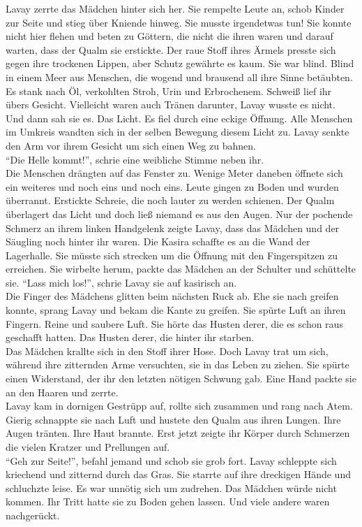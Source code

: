 Lavay zerrte das Mädchen hinter sich her. Sie rempelte Leute an, schob Kinder zur Seite und stieg 
über Kniende hinweg. Sie musste irgendetwas tun! Sie konnte nicht hier flehen und beten zu Göttern, 
die nicht die ihren waren und darauf warten, dass der Qualm sie erstickte. Der raue Stoff ihres 
Ärmels presste sich gegen ihre trockenen Lippen, aber Schutz gewährte es kaum. Sie war blind. Blind 
in einem Meer aus Menschen, die wogend und brausend all ihre Sinne betäubten. Es stank nach Öl, 
verkohlten Stroh, Urin und Erbrochenem. Schweiß lief ihr übers Gesicht. Vielleicht waren auch 
Tränen darunter, Lavay wusste es nicht.\\
Und dann sah sie es. Das Licht. Es fiel durch eine eckige Öffnung. Alle Menschen im Umkreis wandten 
sich in der selben Bewegung diesem Licht zu. Lavay senkte den Arm vor ihrem Gesicht um sich einen 
Weg zu bahnen.\\
``Die Helle kommt!'', schrie eine weibliche Stimme neben ihr.\\
Die Menschen drängten auf das Fenster zu. Wenige Meter daneben öffnete sich ein weiteres und noch 
eins und noch eins. Leute gingen zu Boden und wurden überrannt. Erstickte Schreie, die noch lauter 
zu werden schienen. Der Qualm überlagert das Licht und doch ließ niemand es aus den Augen. Nur der 
pochende Schmerz an ihrem linken Handgelenk zeigte Lavay, dass das Mädchen und der Säugling noch 
hinter ihr waren. Die Kasira schaffte es an die Wand der Lagerhalle. Sie müsste sich strecken um 
die Öffnung mit den Fingerspitzen zu erreichen. Sie wirbelte herum, packte das Mädchen an der  
Schulter und schüttelte sie. ``Lass mich los!'', schrie Lavay sie auf kasirisch an.\\
Die Finger des Mädchens glitten beim nächsten Ruck ab. Ehe sie nach greifen konnte, sprang Lavay 
und bekam die Kante zu greifen. Sie spürte Luft an ihren Fingern. Reine und saubere Luft. Sie hörte 
das Husten derer, die es schon raus geschafft hatten. Das Husten derer, die hinter ihr starben.\\
Das Mädchen krallte sich in den Stoff ihrer Hose. Doch Lavay trat um sich, während ihre zitternden 
Arme versuchten, sie in das Leben zu ziehen. Sie spürte einen Widerstand, der ihr den letzten 
nötigen Schwung gab. Eine Hand packte sie an den Haaren und zerrte.\\
Lavay kam in dornigen Gestrüpp auf, rollte sich zusammen und rang nach Atem. Gierig schnappte 
sie nach Luft und hustete den Qualm aus ihren Lungen. Ihre Augen tränten. Ihre Haut brannte. Erst 
jetzt zeigte ihr Körper durch Schmerzen die vielen Kratzer und Prellungen auf.\\
``Geh zur Seite!'', befahl jemand und schob sie grob fort. Lavay schleppte sich kriechend und 
zitternd durch das Gras. Sie starrte auf ihre dreckigen Hände und schluchzte leise. Es war unnötig 
sich um zudrehen. Das Mädchen würde nicht kommen. Ihr Tritt hatte sie zu Boden gehen lassen. Und 
viele andere waren nachgerückt.\\

